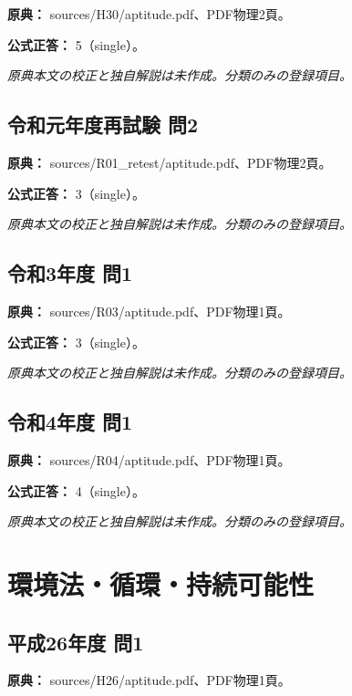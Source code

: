\noindent\textbf{原典：} sources/H30/aptitude.pdf、PDF物理2頁。

\textbf{公式正答：} 5（single）。

\par\textit{原典本文の校正と独自解説は未作成。分類のみの登録項目。}

\subsection{令和元年度再試験 問2}
\label{q:r01-ret-apt-02}

\noindent\textbf{原典：} sources/R01\_retest/aptitude.pdf、PDF物理2頁。

\textbf{公式正答：} 3（single）。

\par\textit{原典本文の校正と独自解説は未作成。分類のみの登録項目。}

\subsection{令和3年度 問1}
\label{q:r03-reg-apt-01}

\noindent\textbf{原典：} sources/R03/aptitude.pdf、PDF物理1頁。

\textbf{公式正答：} 3（single）。

\par\textit{原典本文の校正と独自解説は未作成。分類のみの登録項目。}

\subsection{令和4年度 問1}
\label{q:r04-reg-apt-01}

\noindent\textbf{原典：} sources/R04/aptitude.pdf、PDF物理1頁。

\textbf{公式正答：} 4（single）。

\par\textit{原典本文の校正と独自解説は未作成。分類のみの登録項目。}

\section{環境法・循環・持続可能性}

\subsection{平成26年度 問1}
\label{q:h26-reg-apt-01}

\noindent\textbf{原典：} sources/H26/aptitude.pdf、PDF物理1頁。

